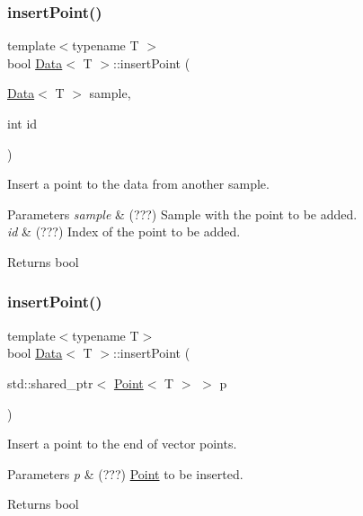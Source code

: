 \subsubsection{\texorpdfstring{insert\+Point()}{insertPoint()}\hspace{0.1cm}{\footnotesize\ttfamily [1/2]}}
{\footnotesize\ttfamily template$<$typename T $>$ \\
bool \mbox{\hyperlink{class_data}{Data}}$<$ T $>$\+::insert\+Point (\begin{DoxyParamCaption}\item[{\mbox{\hyperlink{class_data}{Data}}$<$ T $>$}]{sample,  }\item[{int}]{id }\end{DoxyParamCaption})}



Insert a point to the data from another sample. 


\begin{DoxyParams}{Parameters}
{\em sample} & (???) Sample with the point to be added. \\
\hline
{\em id} & (???) Index of the point to be added. \\
\hline
\end{DoxyParams}
\begin{DoxyReturn}{Returns}
bool 
\end{DoxyReturn}
\mbox{\label{class_data_a709cae94a533608e61a5e1e5039b0b35}} 
\subsubsection{\texorpdfstring{insert\+Point()}{insertPoint()}\hspace{0.1cm}{\footnotesize\ttfamily [2/2]}}
{\footnotesize\ttfamily template$<$typename T$>$ \\
bool \mbox{\hyperlink{class_data}{Data}}$<$ T $>$\+::insert\+Point (\begin{DoxyParamCaption}\item[{std\+::shared\+\_\+ptr$<$ \mbox{\hyperlink{class_point}{Point}}$<$ T $>$ $>$}]{p }\end{DoxyParamCaption})}



Insert a point to the end of vector points. 


\begin{DoxyParams}{Parameters}
{\em p} & (???) \mbox{\hyperlink{class_point}{Point}} to be inserted. \\
\hline
\end{DoxyParams}
\begin{DoxyReturn}{Returns}
bool 
\end{DoxyReturn}
\mbox{\label{class_data_a8b96bf083edf16dd41031c254d32e143}} 
